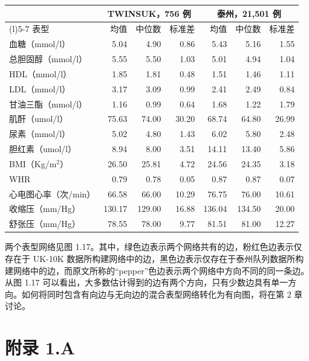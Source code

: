 \begin{table}[htbp]
\centering
{}
\label{tab:omics-common-phenotypes}
\small
\setlength{\tabcolsep}{4pt}
\begin{tabularx}{\textwidth}{@{}>{\raggedright\arraybackslash}Xrrr@{\hspace{1.2em}}rrr@{}}
\toprule
 & \multicolumn{3}{c}{TWINSUK，756 例} & \multicolumn{3}{c}{泰州，21,501 例} \\
\cmidrule(lr){2-4}\cmidrule(l){5-7}
表型 & 均值 & 中位数 & 标准差 & 均值 & 中位数 & 标准差 \\
\midrule
血糖（mmol/l） & 5.04 & 4.90 & 0.86 & 5.43 & 5.16 & 1.55 \\
总胆固醇（mmol/l） & 5.55 & 5.50 & 1.03 & 5.01 & 4.94 & 1.04 \\
HDL（mmol/l） & 1.85 & 1.81 & 0.48 & 1.51 & 1.46 & 1.11 \\
LDL（mmol/l） & 3.17 & 3.09 & 0.99 & 2.41 & 2.49 & 0.84 \\
甘油三酯（mmol/l） & 1.16 & 0.99 & 0.64 & 1.68 & 1.22 & 1.79 \\
肌酐（umol/l） & 75.63 & 74.00 & 30.20 & 68.74 & 64.80 & 26.99 \\
尿素（mmol/l） & 5.02 & 4.80 & 1.43 & 6.02 & 5.80 & 2.48 \\
胆红素（umol/l） & 8.94 & 8.00 & 3.51 & 14.11 & 13.40 & 5.86 \\
BMI（Kg/m$^2$） & 26.50 & 25.81 & 4.72 & 24.56 & 24.35 & 3.18 \\
WHR & 0.79 & 0.78 & 0.05 & 0.87 & 0.87 & 0.07 \\
心电图心率（次/min） & 66.58 & 66.00 & 10.29 & 76.75 & 76.00 & 10.61 \\
收缩压（mm/Hg） & 130.17 & 129.00 & 16.88 & 136.04 & 134.50 & 20.00 \\
舒张压（mm/Hg） & 78.55 & 78.00 & 9.77 & 81.51 & 81.00 & 12.27 \\
\bottomrule
\end{tabularx}
\end{table}

两个表型网络见图 1.17。其中，绿色边表示两个网络共有的边，粉红色边表示仅存在于 UK-10K 数据所构建网络中的边，黑色边表示仅存在于泰州队列数据所构建网络中的边，而原文所称的“pepper”色边表示两个网络中方向不同的同一条边。从图 1.17 可以看出，大多数估计得到的边有两个方向，只有少数边具有单一方向。如何将同时包含有向边与无向边的混合表型网络转化为有向图，将在第 2 章讨论。


\FloatBarrier
\section*{附录 1.A}

